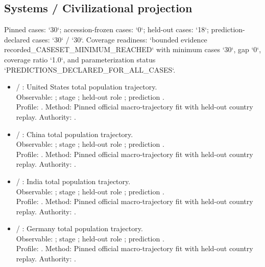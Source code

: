 \subsection{Systems / Civilizational projection}
Pinned cases: `30`; accession-frozen cases: `0`; held-out cases: `18`; prediction-declared cases: `30` / `30`.
Coverage readiness: `bounded evidence recorded\_CASESET\_MINIMUM\_REACHED` with minimum cases `30`, gap `0`, coverage ratio `1.0`, and parameterization status `PREDICTIONS\_DECLARED\_FOR\_ALL\_CASES`.
\begin{itemize}
\item {} / : United States total population trajectory.\\ Observable: ; stage ; held-out role ; prediction .\\ Profile: . Method: Pinned official macro-trajectory fit with held-out country replay. Authority: .
\item {} / : China total population trajectory.\\ Observable: ; stage ; held-out role ; prediction .\\ Profile: . Method: Pinned official macro-trajectory fit with held-out country replay. Authority: .
\item {} / : India total population trajectory.\\ Observable: ; stage ; held-out role ; prediction .\\ Profile: . Method: Pinned official macro-trajectory fit with held-out country replay. Authority: .
\item {} / : Germany total population trajectory.\\ Observable: ; stage ; held-out role ; prediction .\\ Profile: . Method: Pinned official macro-trajectory fit with held-out country replay. Authority: .

\end{itemize}
